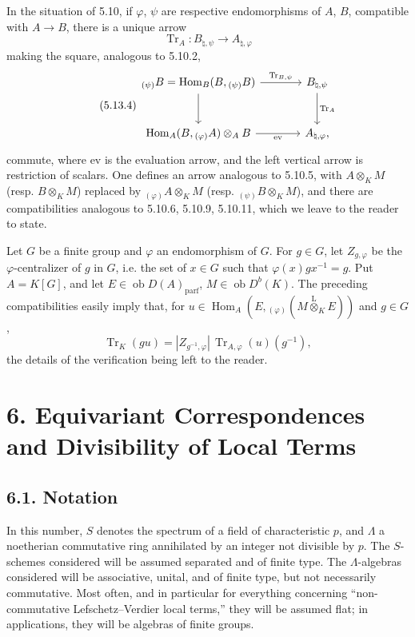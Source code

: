 \documentclass[11pt]{article}
\DeclareMathOperator{\Hom}{Hom}
\newcommand{\ob}{\operatorname{ob}}
\providecommand{\Tr}{\operatorname{Tr}}
\providecommand{\Tr}{\operatorname{Tr}}
\providecommand{\lten}{\overset{\mathrm L}{\otimes}}
\providecommand{\Tr}{\operatorname{Tr}}
\providecommand{\Hom}{\operatorname{Hom}}
\providecommand{\ob}{\operatorname{ob}}
\providecommand{\lten}{\overset{\mathrm L}{\otimes}}
\providecommand{\lten}{\overset{\mathrm L}{\otimes}}
\providecommand{\Tr}{\operatorname{Tr}}
\providecommand{\lten}{\overset{\mathrm L}{\otimes}}
\providecommand{\lten}{\overset{\mathrm L}{\otimes}}
\providecommand{\lten}{\overset{\mathrm L}{\otimes}}
\begin{document}
In the situation of 5.10, if $\varphi$, $\psi$ are respective endomorphisms of $A$, $B$, compatible with $A\to B$, there is a unique arrow
\[
\Tr_A:B_{\natural,\psi}\longrightarrow A_{\natural,\varphi}
\]
making the square, analogous to 5.10.2,
\begin{equation}\tag{5.13.4}
\begin{tikzcd}[column sep=large,row sep=large]
{}_{(\psi)}B=\Hom_B(B,{}_{(\psi)}B) \arrow[r,"\Tr_{B,\psi}"] \arrow[d] & B_{\natural,\psi} \arrow[d,"\Tr_A"]\\
\Hom_A(B,{}_{(\varphi)}A)\otimes_AB \arrow[r,"\mathrm{ev}"'] & A_{\natural,\varphi},
\end{tikzcd}
\end{equation}
commute, where $\mathrm{ev}$ is the evaluation arrow, and the left vertical arrow is restriction of scalars. One defines an arrow analogous to 5.10.5, with $A\otimes_KM$ (resp. $B\otimes_KM$) replaced by ${}_{(\varphi)}A\otimes_KM$ (resp. ${}_{(\psi)}B\otimes_KM$), and there are compatibilities analogous to 5.10.6, 5.10.9, 5.10.11, which we leave to the reader to state.

Let $G$ be a finite group and $\varphi$ an endomorphism of $G$. For $g\in G$, let $Z_{g,\varphi}$ be the $\varphi$-centralizer of $g$ in $G$, i.e. the set of $x\in G$ such that $\varphi(x)gx^{-1}=g$. Put $A=K[G]$, and let $E\in\ob D(A)_{\mathrm{parf}}$, $M\in\ob D^b(K)$. The preceding compatibilities easily imply that, for $u\in\Hom_A(E,{}_{(\varphi)}(M\lten_KE))$ and $g\in G$,
\begin{equation}\tag{5.13.5}
\Tr_K(gu)=|Z_{g^{-1},\varphi}|\,\Tr_{A,\varphi}(u)(g^{-1}),
\end{equation}
the details of the verification being left to the reader.

\section*{6. Equivariant Correspondences and Divisibility of Local Terms}

\subsection*{6.1. Notation}

In this number, $S$ denotes the spectrum of a field of characteristic $p$, and $\Lambda$ a noetherian commutative ring annihilated by an integer not divisible by $p$. The $S$-schemes considered will be assumed separated and of finite type. The $\Lambda$-algebras considered will be associative, unital, and of finite type, but not necessarily commutative. Most often, and in particular for everything concerning “non-commutative Lefschetz--Verdier local terms,” they will be assumed flat; in applications, they will be algebras of finite groups.
\end{document}
